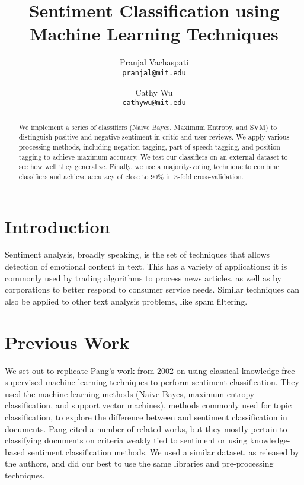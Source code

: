 \documentclass[10pt,twocolumn,letterpaper]{article}
\begin{document}
\title{Sentiment Classification using Machine Learning Techniques}

\author{Pranjal Vachaspati\\
{\tt\small pranjal@mit.edu}
\and
Cathy Wu\\
{\tt\small cathywu@mit.edu}
}

\maketitle
\thispagestyle{empty}

\begin{abstract}
We implement a series of classifiers (Naive Bayes, Maximum Entropy, and SVM) to distinguish positive and negative sentiment in critic and user reviews. We apply various processing methods, including negation tagging, part-of-speech tagging, and position tagging to achieve maximum accuracy. We test our classifiers on an external dataset to see how well they generalize. Finally, we use a majority-voting technique to combine classifiers and achieve accuracy of close to 90\% in 3-fold cross-validation\cite{Authors11}.
\end{abstract}

\section{Introduction}

Sentiment analysis, broadly speaking, is the set of techniques that allows detection of emotional content in text. This has a variety of applications: it is commonly used by trading algorithms to process news articles, as well as by corporations to better respond to consumer service needs. Similar techniques can also be applied to other text analysis problems, like spam filtering.

\section{Previous Work}

We set out to replicate Pang’s work from 2002 on using classical knowledge-free supervised machine learning techniques to perform sentiment classification. They used the machine learning methods (Naive Bayes, maximum entropy classification, and support vector machines), methods commonly used for topic classification, to explore the difference between and sentiment classification in documents. Pang cited a number of related works, but they mostly pertain to classifying documents on criteria weakly tied to sentiment or using knowledge-based sentiment classification methods. We used a similar dataset, as released by the authors, and did our best to use the same libraries and pre-processing techniques.
\end{document}

